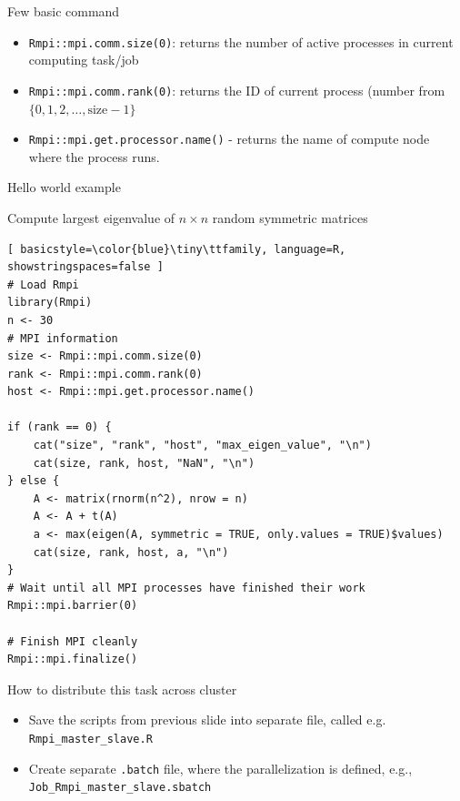 \documentclass[compress,xcolor=table]{beamer}
\begin{document}
	
	\begin{frame}{Few basic command}
		\begin{itemize}
			\item {\tt Rmpi::mpi.comm.size(0)}: returns the number of active processes in current computing task/job
			\item {\tt Rmpi::mpi.comm.rank(0)}: returns the ID of current process (number from $\{0,1,2,\ldots,\mbox{size}-1\}$ 
			\item {\tt Rmpi::mpi.get.processor.name()} - returns the name of compute node where the process runs.
		\end{itemize}
	\end{frame}
	
	
		
	
\begin{frame}[fragile]{Hello world example} 
	\hfill \href{https://github.com/janezpovh/parallel-R-nov-26/blob/main/code/Rmpi_master_slave.R} {
		} 
		\vspace{-1mm} \begin{block} 
			{Compute largest eigenvalue of $n\times n$ random symmetric matrices} 
			\tiny \begin{lstlisting}[ basicstyle=\color{blue}\tiny\ttfamily, language=R, showstringspaces=false ] 
# Load Rmpi
library(Rmpi)
n <- 30
# MPI information
size <- Rmpi::mpi.comm.size(0)
rank <- Rmpi::mpi.comm.rank(0)
host <- Rmpi::mpi.get.processor.name()

if (rank == 0) {
	cat("size", "rank", "host", "max_eigen_value", "\n")
	cat(size, rank, host, "NaN", "\n")	
} else {
	A <- matrix(rnorm(n^2), nrow = n)
	A <- A + t(A)
	a <- max(eigen(A, symmetric = TRUE, only.values = TRUE)$values)
	cat(size, rank, host, a, "\n")
}
# Wait until all MPI processes have finished their work
Rmpi::mpi.barrier(0)

# Finish MPI cleanly
Rmpi::mpi.finalize()			
\end{lstlisting} 
		\end{block} 
\end{frame}


	
	\begin{frame}[fragile]{How to distribute this task across cluster}
		\begin{itemize}
			\item Save the scripts from previous slide into separate file, called e.g. \verb|Rmpi_master_slave.R|
			\item  Create separate \verb|.batch| file, where the parallelization is defined, e.g., 
			\verb|Job_Rmpi_master_slave.sbatch|
		\end{itemize}
	\end{frame}
	
\end{document}
